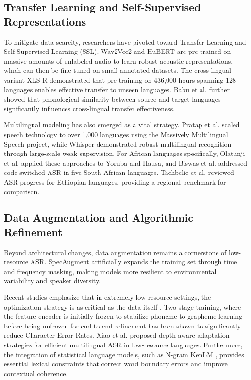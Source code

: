 \documentclass[conference]{IEEEtran}
\begin{document}
\subsection{Transfer Learning and Self-Supervised Representations}

To mitigate data scarcity, researchers have pivoted toward Transfer Learning and Self-Supervised Learning (SSL). Wav2Vec2 \cite{b1} and HuBERT \cite{b16} are pre-trained on massive amounts of unlabeled audio to learn robust acoustic representations, which can then be fine-tuned on small annotated datasets. The cross-lingual variant XLS-R \cite{b15} demonstrated that pre-training on 436,000 hours spanning 128 languages enables effective transfer to unseen languages. Babu et al. \cite{b36} further showed that phonological similarity between source and target languages significantly influences cross-lingual transfer effectiveness.

Multilingual modeling has also emerged as a vital strategy. Pratap et al. \cite{b37} scaled speech technology to over 1,000 languages using the Massively Multilingual Speech project, while Whisper \cite{b2} demonstrated robust multilingual recognition through large-scale weak supervision. For African languages specifically, Olatunji et al. \cite{b38} applied these approaches to Yoruba and Hausa, and Biswas et al. \cite{b39} addressed code-switched ASR in five South African languages. Tachbelie et al. \cite{b40} reviewed ASR progress for Ethiopian languages, providing a regional benchmark for comparison.

\subsection{Data Augmentation and Algorithmic Refinement}

Beyond architectural changes, data augmentation remains a cornerstone of low-resource ASR. SpecAugment \cite{b19} artificially expands the training set through time and frequency masking, making models more resilient to environmental variability and speaker diversity.

Recent studies emphasize that in extremely low-resource settings, the optimization strategy is as critical as the data itself \cite{b21}. Two-stage training, where the feature encoder is initially frozen to stabilize phoneme-to-grapheme learning before being unfrozen for end-to-end refinement has been shown to significantly reduce Character Error Rates. Xiao et al. \cite{b41} proposed depth-aware adaptation strategies for efficient multilingual ASR in low-resource languages. Furthermore, the integration of statistical language models, such as N-gram KenLM \cite{b20}, provides essential lexical constraints that correct word boundary errors and improve contextual coherence.
\end{document}
